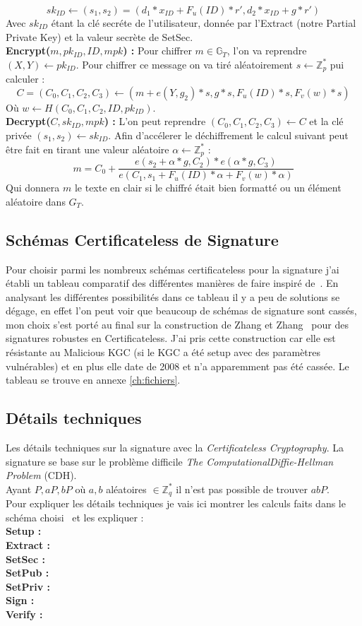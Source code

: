 \[sk_{ID} \leftarrow (s_1, s_2) = (d_1*x_{ID} + F_u(ID)*r', d_2*x_{ID} + g*r')\]
Avec $sk_{ID}$ étant la clé secréte de l'utilisateur, donnée par l'Extract (notre Partial Private Key) et la valeur secrète de SetSec.\\
\textbf{Encrypt($m, pk_{ID}, ID, mpk$) :} Pour chiffrer $m \in \mathbb{G}_T$, l'on va reprendre $(X,Y) \leftarrow pk_{ID}$. Pour chiffrer ce message on va tiré aléatoirement $s \leftarrow \mathbb{Z}_p^*$ pui calculer : 
\[C = (C_0, C_1, C_2, C_3) \leftarrow (m + e(Y, g_2)*s, g*s,F_u(ID)*s, F_v(w)*s )\]
Où $w \leftarrow H(C_0,C_1, C_2, ID, pk_{ID})$.\\
\textbf{Decrypt($C, sk_{ID}, mpk$) :} L'on peut reprendre $(C_0,C_1,C_2,C_3) \leftarrow C$ et la clé privée $(s_1, s_2) \leftarrow sk_{ID}$. Afin d'accélerer le déchiffrement le calcul suivant peut être fait en tirant une valeur aléatoire $\alpha \leftarrow \mathbb{Z}_p^*$ :
\[m = C_0 + \frac{e(s_2 + \alpha*g, C_2 )*e(\alpha*g, C_3)}{e(C_1, s_1 + F_u(ID)*\alpha + F_v(w)*\alpha)}\]
Qui donnera $m$ le texte en clair si le chiffré était bien formatté ou un élément aléatoire dans $G_T$.
\subsection{Schémas Certificateless de Signature}
Pour choisir parmi les nombreux schémas certificateless pour la signature j'ai établi un tableau comparatif des différentes manières de faire inspiré de~\cite{bookIntroCertificateless}. En analysant les différentes possibilités dans ce tableau il y a peu de solutions se dégage, en effet l'on peut voir que beaucoup de schémas de signature sont cassés, mon choix s'est porté au final sur la construction de Zhang et Zhang~\cite{DBLP:conf/icc/ZhangZ08a} pour des signatures robustes en Certificateless. J'ai pris cette construction car elle est résistante au Malicious KGC (si le KGC a été setup avec des paramètres vulnérables) et en plus elle date de 2008 et n'a apparemment pas été cassée. Le tableau se trouve en annexe \ref{ch:fichiers}.
\subsection{Détails techniques}
Les détails techniques sur la signature avec la \textit{Certificateless Cryptography}.
La signature se base sur le problème difficile \textit{The ComputationalDiffie-Hellman Problem} (CDH). \\Ayant $P, aP, bP$ où $a,b$ aléatoires $\in \mathbb{Z}_q^*$ il n'est pas possible de trouver $abP$.\\
Pour expliquer les détails techniques je vais ici montrer les calculs faits dans le schéma choisi~\cite{DBLP:conf/icc/ZhangZ08a} et les expliquer :\\
\textbf{Setup :}\\
\textbf{Extract :}\\
\textbf{SetSec :}\\
\textbf{SetPub :}\\
\textbf{SetPriv :}\\
\textbf{Sign :}\\
\textbf{Verify :}
